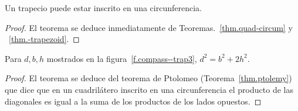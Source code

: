 \begin{theorem}
Un trapecio  puede estar inscrito en una circunferencia.
\end{theorem}

\begin{proof}
El teorema se deduce inmediatamente de Teoremas.~\ref{thm.quad-circum} y ~\ref{thm.-trapezoid}.
\end{proof}

\begin{theorem}\label{thm.ptolemy-trap}
Para $d,b,h$ mostrados en la figura~\ref{f.compass--trap3}, $d^2=b^2+2h^2$.
\end{theorem}

\begin{proof}
El teorema se deduce del teorema de Ptolomeo (Teorema~\ref{thm.ptolemy}) que dice que en un cuadrilátero inscrito en una circunferencia el producto de las diagonales es igual a la suma de los productos de los lados opuestos.
\end{proof}

